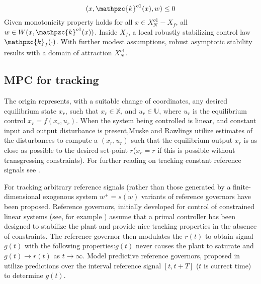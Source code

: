 \begin{equation}
    [\overset{\ast}{V}^0+\mathpzc{l}](x,\mathpzc{k}^{o1}(x),w)\le 0
\end{equation}
\noindent Given monotonicity property holds for all $x \in X_N^{o1}-X_f$, all $w\in W(x,\mathpzc{k}^{o1}(x))$. Inside $X_f$, a local robustly stabilizing control law $\mathpzc{k}_f(\cdot)$. With further modest assumptions, robust asymptotic stability results with a domain of attraction $X_N^{o1}$.

\subsection{MPC for tracking}
\noindent The origin represents, with a suitable change of coordinates, any desired equilibrium state $x_r$, such that $x_r \in \mathbb{X}$, and $u_r\in\mathbb{U}$, where $u_r$ is the equilibrium control $x_r=f(x_r,u_r)$. When the system being controlled is linear, and constant input and output disturbance is present,Muske and Rawlings \cite{muske1993receding} utilize estimates of the disturbances to compute a $(x_r,u_r)$ such that the equilibrium output $x_r$ is as close as possible to the desired set-point $r$($x_r=r$ if this is possible without transgressing constraints). For further reading on tracking constant reference signals see \cite{jha2013position,lee1997stable,rawlings1994nonlinear,meadows1998feedback}. 

For tracking arbitrary reference signals (rather than those generated by a finite-dimensional exogenous system $w^+=s(w)$ variants of reference governors have been proposed. Reference governors, initially developed for control of constrained linear systems (see, for example \cite{gilbert1994nonlinear}) assume that a primal controller has been designed to stabilize the plant and provide nice tracking properties in the absence of constraints. The reference governor then modulates the $r(t)$ to obtain signal $g(t)$ with the following
properties:$g(t)$ never causes the plant to saturate and $g(t)\to r(t)$ as $t\to\infty$. Model predictive reference governors, proposed in \cite{bemporad1997nonlinear,bemporad1998fulfilling} utilize predictions over the interval reference signal $[t,t+T]$ ($t$ is currect time) to determine $g(t)$.

